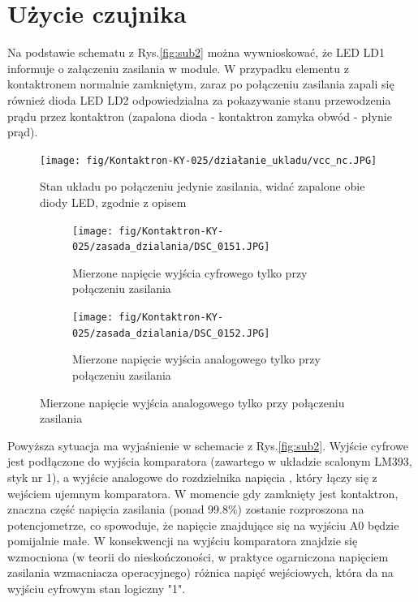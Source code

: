 \documentclass[11pt, a4paper]{article}
\begin{document}
\section{Użycie czujnika}
Na podstawie schematu z Rys.\ref{fig:sub2} można wywnioskować, że LED LD1 informuje o załączeniu zasilania w module. W przypadku elementu z kontaktronem normalnie zamkniętym, zaraz po połączeniu zasilania zapali się również dioda LED LD2 odpowiedzialna za pokazywanie stanu przewodzenia prądu przez kontaktron (zapalona dioda - kontaktron zamyka obwód - płynie prąd). 
\vspace{0.2cm}
\begin{figure}[H]
\centering
\texttt{[image: fig/Kontaktron-KY-025/działanie\_ukladu/vcc\_nc.JPG]}
\caption{Stan układu po połączeniu jedynie zasilania, widać zapalone obie diody LED, zgodnie z opisem}
\label{fig:sub3}
\end{figure}
\vspace{0.2cm}
\vspace{0.2cm}
\begin{figure}[H]
\centering
\begin{subfigure}{.5\textwidth}
  \centering
  \texttt{[image: fig/Kontaktron-KY-025/zasada\_dzialania/DSC\_0151.JPG]}
  \label{fig:sub1}
  \caption{Mierzone napięcie wyjścia cyfrowego tylko przy połączeniu zasilania}
\end{subfigure}%
\begin{subfigure}{.5\textwidth}
  \centering
  \texttt{[image: fig/Kontaktron-KY-025/zasada\_dzialania/DSC\_0152.JPG]}
  \label{fig:sub1}
  \caption{Mierzone napięcie wyjścia analogowego tylko przy połączeniu zasilania}
\end{subfigure}
\label{fig:test}
\end{figure}
\vspace{0.2cm}
Powyższa sytuacja ma wyjaśnienie w schemacie z Rys.\ref{fig:sub2}. Wyjście cyfrowe jest podłączone do wyjścia komparatora (zawartego w układzie scalonym LM393, styk nr 1), a wyjście analogowe do rozdzielnika napięcia , który łączy się z wejściem ujemnym komparatora. W momencie gdy zamknięty jest kontaktron, znaczna część napięcia zasilania (ponad 99.8\%) zostanie rozproszona na potencjometrze, co spowoduje, że napięcie znajdujące się na wyjściu A0 będzie pomijalnie małe. W konsekwencji na wyjściu komparatora znajdzie się wzmocniona (w teorii do nieskończoności, w praktyce ogarniczona napięciem zasilania wzmacniacza operacyjnego) różnica napięć wejściowych, która da na wyjściu cyfrowym stan logiczny "1".
\end{document}
